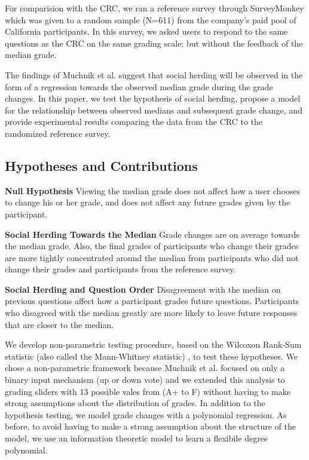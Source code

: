 For comparision with the CRC, we ran a reference survey through SurveyMonkey which was given to a random sample (N=611) from the company's paid pool of California participants.
In this survey, we asked users to respond to the same questions as the CRC on the same grading scale; but without the feedback of the median grade. 

The findings of Muchnik et al. suggest that social herding will be observed in the form of a regression towards the observed median grade during the grade changes.
In this paper, we test the hypothesis of social herding, propose a model for the relationship between observed medians and subsequent grade change, and provide experimental results comparing the data from the CRC to the randomized reference survey.

\subsection{Hypotheses and Contributions}
\noindent \textbf{Null Hypothesis} Viewing the median grade does not affect how a user chooses to change his or her grade, and does not affect any future grades given by the participant.

\noindent \textbf{Social Herding Towards the Median} Grade changes are on average towards the median grade. Also, the final grades of participants who change their grades are more tightly concentrated around the median from participants who did not change their grades and participants from the reference survey.

\noindent \textbf{Social Herding and Question Order} Disagreement with the median on previous questions affect how a participant grades future questions. Participants who disagreed with the median greatly are more likely to leave future responses that are closer to the median. 

We develop non-parametric testing procedure, based on the Wilcoxon Rank-Sum statistic (also called the Mann-Whitney statistic) \cite{lehmann2006nonparametrics}, to test these hypotheses.
We chose a non-parametric framework because Muchnik et al. focused on only a binary input mechanism (up or down vote) and we extended this analysis to grading sliders with 13 possible vales from (A+ to F) without having to make strong assumptions about the distribution of grades.
In addition to the hypothesis testing, we model grade changes with a polynomial regression.
As before, to avoid having to make a strong assumption about the structure of the model, we use an information theoretic model to learn a flexibile degree polynomial.

